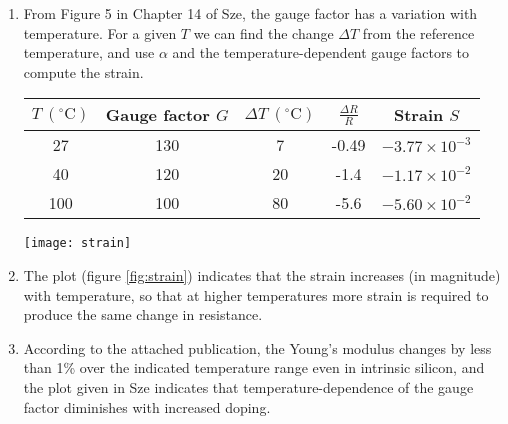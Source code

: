 \documentclass{article}
\begin{document}
\begin{enumerate}
  \item{From Figure 5 in Chapter 14 of Sze, the gauge factor has a variation 
        with temperature. For a given $T$ we can find the change $\Delta T$ 
        from the reference temperature, and use $\alpha$ and the
        temperature-dependent gauge factors to compute the strain.

        \begin{tabular}{c | c c c c}
        $T ~(^\circ \mathrm{C})$ & Gauge factor $G$ & $\Delta T ~(^\circ \mathrm{C})$ & $\frac{\Delta R}{R}$ & Strain $S$ \\
        \hline
        27                       & 130              & 7                               & -0.49                & $-3.77 \times 10^{-3}$ \\
        40                       & 120              & 20                              & -1.4                 & $-1.17 \times 10^{-2}$ \\
        100                      & 100              & 80                              & -5.6                 & $-5.60 \times 10^{-2}$
        \end{tabular}

        \begin{sidewaysfigure}
          \texttt{[image: strain]}
          \caption{Strain versus temperature. \label{fig:strain}}
        \end{sidewaysfigure}
       }
  \item{ The plot (figure \ref{fig:strain}) indicates that the strain increases (in magnitude)
         with temperature, so that at higher temperatures more strain is 
         required to produce the same change in resistance.
       }
   \item{According to the attached publication, the Young's modulus changes by
         less than 1\% over the indicated temperature range even in intrinsic
         silicon, and the plot given in Sze indicates that 
         temperature-dependence of the gauge factor diminishes with increased
         doping.
        }
\end{enumerate}
\end{document}
